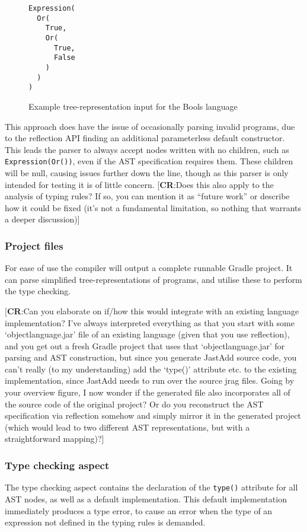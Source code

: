 \documentclass[nofilelist]{cslthse-msc}
\newcommand{\CR}[1]{\textcolor{green!60!black}{[\textbf{CR}:#1]}}
\begin{document}
\begin{figure}[h]
\begin{lstlisting}[]
Expression(
  Or(
    True,
    Or(
      True,
      False
    )
  )
)
\end{lstlisting}
  \caption{Example tree-representation input for the Bools language}
  \label{boolinputexample}
\end{figure}

This approach does have the issue of occasionally parsing invalid programs, due to the reflection API finding an additional parameterless default constructor.
This leads the parser to always accept nodes written with no children, such as \lstinline{Expression(Or())}, even if the AST specification requires them.
These children will be null, causing issues further down the line, though as this parser is only intended for testing it is of little concern.
\CR{Does this also apply to the analysis of typing rules?  If so, you can mention it as ``future work''
  or describe how it could be fixed (it's not a fundamental limitation, so nothing that warrants a deeper discussion)}

\subsubsection{Project files}\label{projectfiles}
For ease of use the compiler will output a complete runnable Gradle project.
It can parse simplified tree-representations of programs, and utilise these to perform the type checking.

\CR{Can you elaborate on if/how this would integrate with an existing language implementation?
  I've always interpreted everything as that you start with some `objectlanguage.jar' file of an existing language
  (given that you use reflection), and you get out
  a fresh Gradle project that uses that `objectlanguage.jar' for parsing and AST construction,
  but since you generate JastAdd source code, you can't really (to my understanding) add the `type()' attribute etc.\@
  to the existing implementation, since JastAdd needs to run over the source jrag files.
  Going by your overview figure, I now wonder if the generated file also incorporates all of the source code of the original
  project?  Or do you reconstruct the AST specification via reflection somehow and simply mirror it in the generated
  project (which would lead to two different AST representations, but with a straightforward mapping)?}


\subsubsection{Type checking aspect}\label{typecheckingaspect}
The type checking aspect contains the declaration of the \lstinline{type()} attribute for all AST nodes, as well as a default implementation.
This default implementation immediately produces a type error, to cause an error when the type of an expression not defined in the typing rules is demanded.
\end{document}
